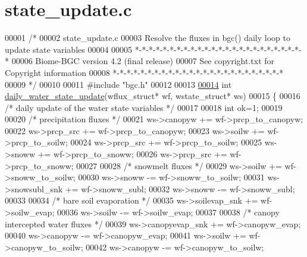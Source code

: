 \hypertarget{state__update_8c_source}{}\section{state\+\_\+update.\+c}
\label{state__update_8c_source}

\begin{DoxyCode}
00001 \textcolor{comment}{/*}
00002 \textcolor{comment}{state\_update.c}
00003 \textcolor{comment}{Resolve the fluxes in bgc() daily loop to update state variables}
00004 \textcolor{comment}{}
00005 \textcolor{comment}{*-*-*-*-*-*-*-*-*-*-*-*-*-*-*-*-*-*-*-*-*-*-*-*-*}
00006 \textcolor{comment}{Biome-BGC version 4.2 (final release)}
00007 \textcolor{comment}{See copyright.txt for Copyright information}
00008 \textcolor{comment}{*-*-*-*-*-*-*-*-*-*-*-*-*-*-*-*-*-*-*-*-*-*-*-*-*}
00009 \textcolor{comment}{*/}
00010 
00011 \textcolor{preprocessor}{#include "bgc.h"}
00012 
00013 
\hypertarget{state__update_8c_source_l00014}{}\hyperlink{state__update_8c_a7107f4defb131263ebb760ecf8423ab6}{00014} \textcolor{keywordtype}{int} \hyperlink{state__update_8c_a7107f4defb131263ebb760ecf8423ab6}{daily\_water\_state\_update}(wflux\_struct* wf, wstate\_struct* ws)
00015 \{
00016     \textcolor{comment}{/* daily update of the water state variables */}
00017      
00018     \textcolor{keywordtype}{int} ok=1;
00019     
00020     \textcolor{comment}{/* precipitation fluxes */}
00021     ws->canopyw        += wf->prcp\_to\_canopyw;
00022     ws->prcp\_src       += wf->prcp\_to\_canopyw;
00023     ws->soilw          += wf->prcp\_to\_soilw;
00024     ws->prcp\_src       += wf->prcp\_to\_soilw;
00025     ws->snoww          += wf->prcp\_to\_snoww;
00026     ws->prcp\_src       += wf->prcp\_to\_snoww;
00027     
00028     \textcolor{comment}{/* snowmelt fluxes */}
00029     ws->soilw          += wf->snoww\_to\_soilw;
00030     ws->snoww          -= wf->snoww\_to\_soilw;
00031     ws->snowsubl\_snk   += wf->snoww\_subl;
00032     ws->snoww          -= wf->snoww\_subl;
00033     
00034     \textcolor{comment}{/* bare soil evaporation */}
00035     ws->soilevap\_snk   += wf->soilw\_evap;
00036     ws->soilw          -= wf->soilw\_evap;
00037     
00038     \textcolor{comment}{/* canopy intercepted water fluxes */}
00039     ws->canopyevap\_snk += wf->canopyw\_evap;
00040     ws->canopyw        -= wf->canopyw\_evap;
00041     ws->soilw          += wf->canopyw\_to\_soilw;
00042     ws->canopyw        -= wf->canopyw\_to\_soilw;

\end{DoxyCode}
